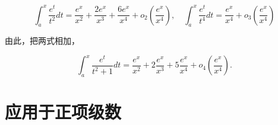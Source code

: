 \[
\int_ {a} ^ {x} \frac {e ^ {t}}{t ^ {2}} d t = \frac {e ^ {x}}{x ^ {2}} + \frac {2 e ^ {x}}{x ^ {3}} + \frac {6 e ^ {x}}{x ^ {4}} + o _ {2} \left(\frac {e ^ {x}}{x ^ {4}}\right), \quad \int_ {a} ^ {x} \frac {e ^ {t}}{t ^ {4}} d t = \frac {e ^ {x}}{x ^ {4}} + o _ {3} \left(\frac {e ^ {x}}{x ^ {4}}\right)
\]

由此，把两式相加，

\[
\int_ {a} ^ {x} \frac {e ^ {t}}{t ^ {2} + 1} d t = \frac {e ^ {x}}{x ^ {2}} + 2 \frac {e ^ {x}}{x ^ {3}} + 5 \frac {e ^ {x}}{x ^ {4}} + o _ {4} \left(\frac {e ^ {x}}{x ^ {4}}\right).
\]

\section{应用于正项级数}
